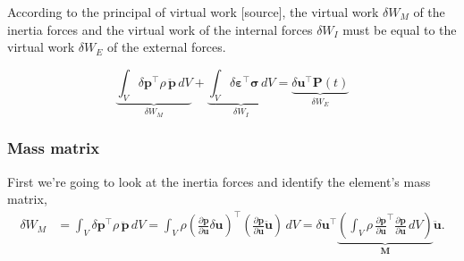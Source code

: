 According to the principal of virtual work [source], the virtual work $\delta W_{M}$ of the inertia forces and the virtual work of the internal forces $\delta W_{I}$ must be equal to the virtual work $\delta W_{E}$ of the external forces.


\begin{equation}
\underbrace{\int_{V} \delta\boldsymbol{p}^\intercal\rho\,\ddot{\boldsymbol{p}}\,dV}_{\delta W_{M}} + \underbrace{\int_{V} \delta\boldsymbol{\varepsilon}^\intercal\boldsymbol{\sigma}\,dV}_{\delta W_{I}} = \underbrace{\delta\boldsymbol{u}^\intercal\boldsymbol{P}(t)}_{\delta W_{E}}
\end{equation}


\subsubsection{Mass matrix}

First we're going to look at the inertia forces and identify the element's mass matrix,
%
\begin{align}
\delta W_{M} &= \int_{V} \delta\boldsymbol{p}^\intercal\rho\,\ddot{\boldsymbol{p}}\,dV = \int_{V} \rho\left(\frac{\partial\boldsymbol{p}}{\partial\boldsymbol{u}}\delta\boldsymbol{u}\right)^\intercal\left(\frac{\partial\boldsymbol{p}}{\partial\boldsymbol{u}}\ddot{\boldsymbol{u}}\right)\,dV = \delta\boldsymbol{u}^\intercal\underbrace{\left(\int_{V} \rho\,\frac{\partial\boldsymbol{p}}{\partial\boldsymbol{u}}^\intercal\frac{\partial\boldsymbol{p}}{\partial\boldsymbol{u}}\,dV\right)}_{\boldsymbol{M}}\ddot{\boldsymbol{u}}.
\end{align}

